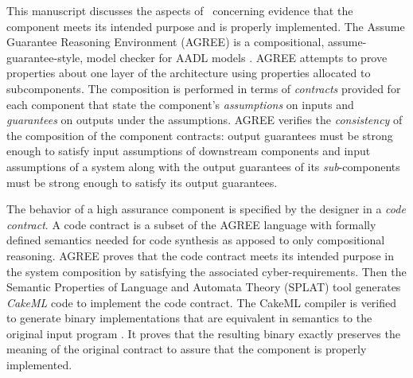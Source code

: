 This manuscript discusses the aspects of \brfcs\ concerning evidence that the component meets its intended purpose and is properly implemented.
The Assume Guarantee Reasoning Environment (AGREE) is a compositional, assume-guarantee-style, model checker for AADL models \cite{compositional-analysis-agree,nfm:agree}. 
AGREE attempts to prove properties about one layer of the architecture using properties allocated to subcomponents.
The composition is performed in terms of \emph{contracts} provided for each component that state the component's \emph{assumptions} on inputs and \emph{guarantees} on outputs under the assumptions.
AGREE verifies the \emph{consistency} of the composition of the component contracts: output guarantees must be strong enough to satisfy input assumptions of downstream components and input assumptions of a system along with the output guarantees of its \emph{sub}-components must be strong enough to satisfy its output guarantees.

The behavior of a high assurance component is specified by the designer in a \emph{code contract}.
A code contract is a subset of the AGREE language with formally defined semantics needed for code synthesis as apposed to only compositional reasoning.
AGREE proves that the code contract meets its intended purpose in the system composition by satisfying the associated cyber-requirements.
Then the Semantic Properties of Language and Automata Theory (SPLAT) tool generates \emph{CakeML} code to implement the code contract.
The CakeML compiler is verified to generate binary implementations that are equivalent in semantics to the original input program \cite{cakeml}.
It proves that the resulting binary exactly preserves the meaning of the original contract to assure that the component is properly implemented.